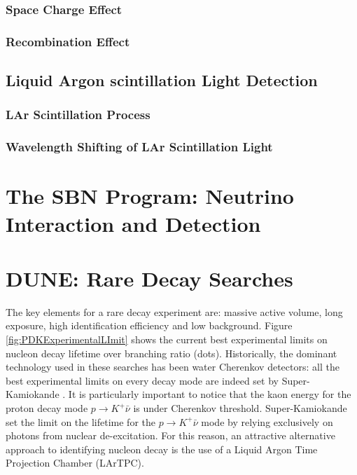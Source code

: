 \subsubsection{Space Charge Effect}
\subsubsection{Recombination Effect}
\subsection{Liquid Argon scintillation Light Detection}
\subsubsection{LAr Scintillation Process}
\subsubsection{Wavelength Shifting of LAr Scintillation Light}
\section{The SBN Program: Neutrino Interaction and Detection}
\section{DUNE: Rare Decay Searches}
The key elements for a rare decay experiment are: massive active volume, long exposure, high identification efficiency and low background. 
Figure \ref{fig:PDKExperimentalLImit} shows the current best experimental limits on nucleon decay lifetime over branching ratio (dots). Historically, the dominant technology used in these searches has been water Cherenkov detectors: all the best experimental limits on every decay mode are indeed set by Super-Kamiokande \cite{PhysRevD.90.072005,PhysRevLett.115.121803}.  It is particularly important to notice that the kaon energy for the proton decay mode $p \rightarrow K^+ \bar{\nu}$ is under Cherenkov threshold.  Super-Kamiokande set the limit on the lifetime for the $p \rightarrow K^+ \bar{\nu}$ mode by  relying exclusively on photons from nuclear de-excitation. For this reason, an attractive alternative approach to identifying nucleon decay is the use of a Liquid Argon Time Projection Chamber (LArTPC). 

